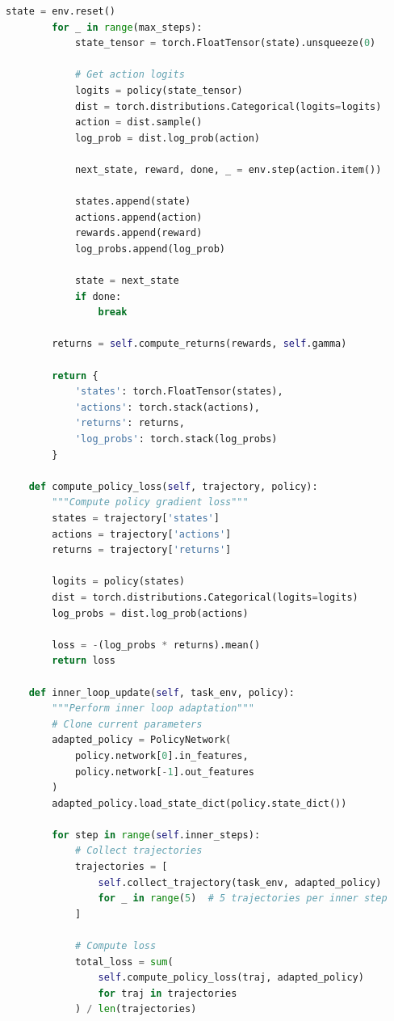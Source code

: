 \documentclass[12pt]{article}
\begin{document}
{{\begin{lstlisting}[language=Python, caption=MAML Implementation for RL]
        state = env.reset()
        for _ in range(max_steps):
            state_tensor = torch.FloatTensor(state).unsqueeze(0)

            # Get action logits
            logits = policy(state_tensor)
            dist = torch.distributions.Categorical(logits=logits)
            action = dist.sample()
            log_prob = dist.log_prob(action)

            next_state, reward, done, _ = env.step(action.item())

            states.append(state)
            actions.append(action)
            rewards.append(reward)
            log_probs.append(log_prob)

            state = next_state
            if done:
                break

        returns = self.compute_returns(rewards, self.gamma)

        return {
            'states': torch.FloatTensor(states),
            'actions': torch.stack(actions),
            'returns': returns,
            'log_probs': torch.stack(log_probs)
        }

    def compute_policy_loss(self, trajectory, policy):
        """Compute policy gradient loss"""
        states = trajectory['states']
        actions = trajectory['actions']
        returns = trajectory['returns']

        logits = policy(states)
        dist = torch.distributions.Categorical(logits=logits)
        log_probs = dist.log_prob(actions)

        loss = -(log_probs * returns).mean()
        return loss

    def inner_loop_update(self, task_env, policy):
        """Perform inner loop adaptation"""
        # Clone current parameters
        adapted_policy = PolicyNetwork(
            policy.network[0].in_features,
            policy.network[-1].out_features
        )
        adapted_policy.load_state_dict(policy.state_dict())

        for step in range(self.inner_steps):
            # Collect trajectories
            trajectories = [
                self.collect_trajectory(task_env, adapted_policy)
                for _ in range(5)  # 5 trajectories per inner step
            ]

            # Compute loss
            total_loss = sum(
                self.compute_policy_loss(traj, adapted_policy)
                for traj in trajectories
            ) / len(trajectories)


\end{lstlisting}}}
\end{document}
